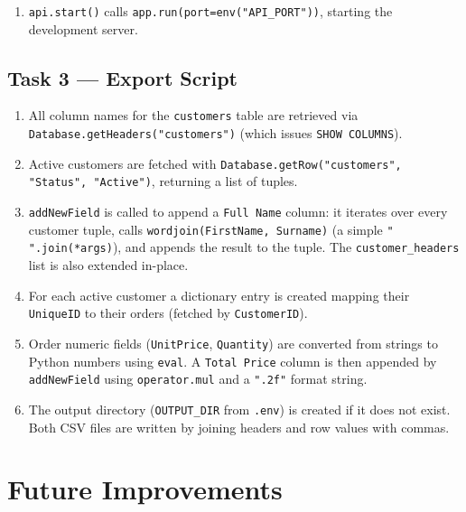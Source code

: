 \documentclass[12pt,a4paper]{article}
\begin{document}
\begin{enumerate}[leftmargin=2em]
    \item \texttt{api.start()} calls \texttt{app.run(port=env("API\_PORT"))},
          starting the development server.
\end{enumerate}

\subsection{Task 3 --- Export Script}

\begin{enumerate}[leftmargin=2em]
    \item All column names for the \texttt{customers} table are retrieved via
          \texttt{Database.getHeaders("customers")} (which issues
          \texttt{SHOW COLUMNS}).

    \item Active customers are fetched with
          \texttt{Database.getRow("customers", "Status", "Active")}, returning
          a list of tuples.

    \item \texttt{addNewField} is called to append a \texttt{Full Name} column:
          it iterates over every customer tuple, calls \texttt{wordjoin(FirstName, Surname)}
          (a simple \texttt{" ".join(*args)}), and appends the result to the
          tuple. The \texttt{customer\_headers} list is also extended in-place.

    \item For each active customer a dictionary entry is created mapping their
          \texttt{UniqueID} to their orders (fetched by
          \texttt{CustomerID}).

    \item Order numeric fields (\texttt{UnitPrice}, \texttt{Quantity}) are
          converted from strings to Python numbers using \texttt{eval}. A
          \texttt{Total Price} column is then appended by
          \texttt{addNewField} using \texttt{operator.mul} and a
          \texttt{".2f"} format string.

    \item The output directory (\texttt{OUTPUT\_DIR} from \texttt{.env}) is
          created if it does not exist. Both CSV files are written by
          joining headers and row values with commas.
\end{enumerate}

\section{Future Improvements}
\end{document}
